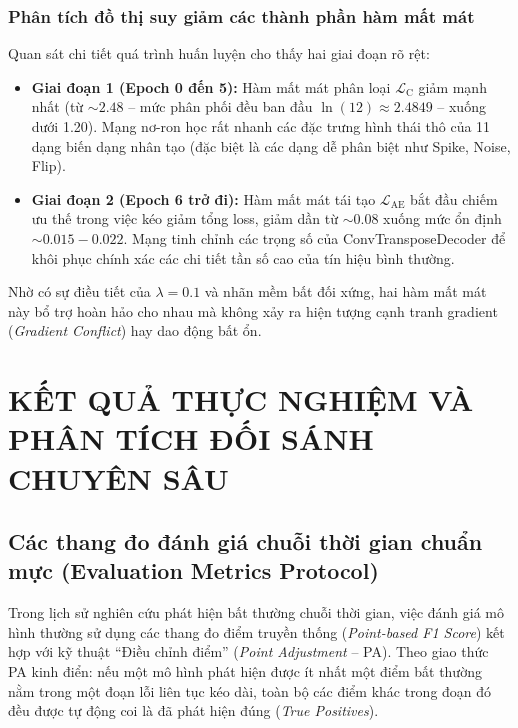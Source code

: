 \documentclass[11pt,journal,onecolumn]{IEEEtran}
\begin{document}
\subsubsection{Phân tích đồ thị suy giảm các thành phần hàm mất mát}
Quan sát chi tiết quá trình huấn luyện cho thấy hai giai đoạn rõ rệt:
\begin{itemize}
    \item \textbf{Giai đoạn 1 (Epoch 0 đến 5):} Hàm mất mát phân loại $\mathcal{L}_{\text{C}}$ giảm mạnh nhất (từ $\sim 2.48$ -- mức phân phối đều ban đầu $\ln(12) \approx 2.4849$ -- xuống dưới 1.20). Mạng nơ-ron học rất nhanh các đặc trưng hình thái thô của 11 dạng biến dạng nhân tạo (đặc biệt là các dạng dễ phân biệt như Spike, Noise, Flip).
    \item \textbf{Giai đoạn 2 (Epoch 6 trở đi):} Hàm mất mát tái tạo $\mathcal{L}_{\text{AE}}$ bắt đầu chiếm ưu thế trong việc kéo giảm tổng loss, giảm dần từ $\sim 0.08$ xuống mức ổn định $\sim 0.015 - 0.022$. Mạng tinh chỉnh các trọng số của ConvTransposeDecoder để khôi phục chính xác các chi tiết tần số cao của tín hiệu bình thường.
\end{itemize}
Nhờ có sự điều tiết của $\lambda = 0.1$ và nhãn mềm bất đối xứng, hai hàm mất mát này bổ trợ hoàn hảo cho nhau mà không xảy ra hiện tượng cạnh tranh gradient (\textit{Gradient Conflict}) hay dao động bất ổn.






\section{KẾT QUẢ THỰC NGHIỆM VÀ PHÂN TÍCH ĐỐI SÁNH CHUYÊN SÂU}
\label{sec:chapter5}

\subsection{Các thang đo đánh giá chuỗi thời gian chuẩn mực (Evaluation Metrics Protocol)}
Trong lịch sử nghiên cứu phát hiện bất thường chuỗi thời gian, việc đánh giá mô hình thường sử dụng các thang đo điểm truyền thống (\textit{Point-based F1 Score}) kết hợp với kỹ thuật ``Điều chỉnh điểm'' (\textit{Point Adjustment} -- PA). Theo giao thức PA kinh điển: nếu một mô hình phát hiện được ít nhất một điểm bất thường nằm trong một đoạn lỗi liên tục kéo dài, toàn bộ các điểm khác trong đoạn đó đều được tự động coi là đã phát hiện đúng (\textit{True Positives}).
\end{document}
